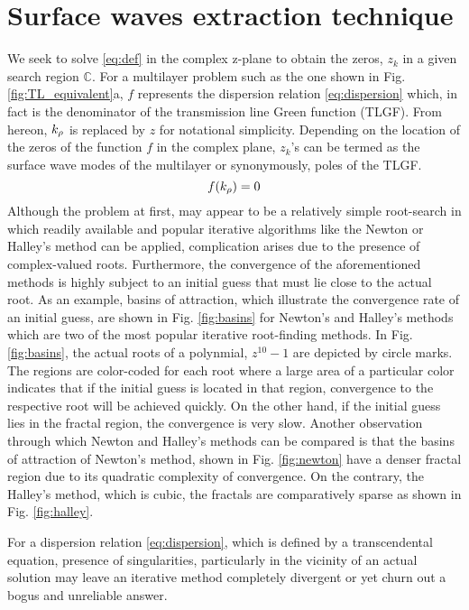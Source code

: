 \documentclass[12pt]{article}
\begin{document}
\section{Surface waves extraction technique}
%
We seek to solve \eqref{eq:def} in the complex z-plane to obtain the zeros, $z_k$ in a given search region $\mathbb{C}$. For a multilayer problem such as the one shown in Fig. \ref{fig:TL_equivalent}a, $f$ represents the dispersion relation \eqref{eq:dispersion} which, in fact is the denominator of the  transmission line Green function (TLGF). From hereon, $k_{\rho}$ is replaced by $z$ for notational simplicity. Depending on the location of the zeros of the function $f$ in the complex plane, $z_k$'s can be termed as the surface wave modes of the multilayer or synonymously, poles of the TLGF.
%
\begin{equation}
  f(k_{\rho}) = 0
  \label{eq:def}
\end{equation}
%
Although the problem at first, may appear to be a relatively simple root-search in which readily available and popular iterative algorithms like the Newton or Halley's method can be applied, complication arises due to the presence of complex-valued roots. Furthermore, the convergence of the aforementioned methods is highly subject to an initial guess that must lie close to the actual root. As an example, basins of attraction, which illustrate the convergence rate of an initial guess, are shown in Fig. \ref{fig:basins} for Newton's and Halley's methods which are two of the most popular iterative root-finding methods. In Fig. \ref{fig:basins}, the actual roots of a polynmial, $z^{10}-1$ are depicted by circle marks. The regions are color-coded for each root where a large area of a particular color indicates that if the initial guess is located in that region, convergence to the respective root will be achieved quickly. On the other hand, if the initial guess lies in the fractal region, the convergence is very slow. Another observation through which Newton and Halley's methods can be compared is that the basins of attraction of Newton's method,
shown in Fig. \ref{fig:newton} have a denser fractal region due to its quadratic complexity of convergence. On the contrary, the Halley's method, which is cubic, the fractals are comparatively sparse as shown in Fig. \ref{fig:halley}.

For a dispersion relation \eqref{eq:dispersion}, which is defined by a transcendental equation, presence of singularities, particularly in the vicinity of an actual solution may leave an iterative method completely divergent or yet churn out a bogus and unreliable answer.
\end{document}
